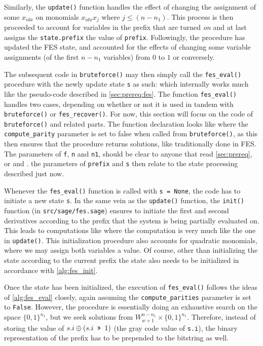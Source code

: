Similarly, the \texttt{update()} function handles the effect of changing the assignment of some $x_{idx}$ on monomials $x_{idx}x_j$ where $j \leq (n - n_1)$. This process is then proceeded to account for variables in the prefix that are turned \textit{on} and at last assigns the \texttt{state.prefix} the value of \texttt{prefix}. Followingly, the procedure has updated the FES state, and accounted for the effects of changing some variable assignments (of the first $n - n_1$ variables) from $0$ to $1$ or conversely.

The subsequent code in \texttt{bruteforce()} may then simply call the \texttt{fes\_eval()} procedure with the newly update state \texttt{s} as such:
which internally works much like the pseudo-code described in \cref{sec:prereq:fes}. The function \texttt{fes\_eval()} handles two cases, depending on whether or not it is used in tandem with \texttt{bruteforce()} or \texttt{fes\_recover()}. For now, this section will focus on the code of \texttt{bruteforce()} and related parts. The function declaration looks like
where the \texttt{compute\_parity} parameter is set to false when called from \texttt{bruteforce()}, as this then ensures that the procedure returns solutions, like traditionally done in FES. The parameters of \texttt{f}, \texttt{n} and \texttt{n1}, should be clear to anyone that read \cref{sec:prereq}, or \cite{eurocrypt-2021-30841} and \cite{cryptoeprint:2013/436}. the parameters of \texttt{prefix} and \texttt{s} then relate to the state processing described just now.

Whenever the \texttt{fes\_eval()} function is called with \texttt{s = None}, the code has to initiate a new state \texttt{s}. In the same vein as the \texttt{update()} function, the \texttt{init()} function (in \texttt{src/sage/fes.sage}) ensures to initiate the first and second derivatives according to the prefix that the system is being partially evaluated on. This leads to computations like
where the computation is very much like the one in \texttt{update()}. This initialization procedure also accounts for quadratic monomials, where we may assign both variables a value. Of course, other than initializing the state according to the current prefix the state also needs to be initialized in accordance with \cref{alg:fes_init}.

Once the state has been initialized, the execution of \texttt{fes\_eval()} follows the ideas of \cref{alg:fes_eval} closely, again assuming the \texttt{compute\_parities} parameter is set to \texttt{False}. However, the procedure is essentially doing an exhaustive search on the space $\{0,1\}^{n_1}$, but we seek solutions from $W^{n - n_1}_{w + 1} \times \{0, 1\}^{n_1}$. Therefore, instead of storing the value of $s.i \oplus (s.i \texttt{ >> } 1)$ (the gray code value of \texttt{s.i}), the binary representation of the prefix has to be prepended to the bitstring as well. 

